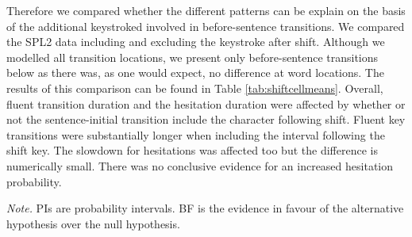 \begin{appendix}
Therefore we compared whether the different patterns can be explain on
the basis of the additional keystroked involved in before-sentence
transitions. We compared the SPL2 data including and excluding the
keystroke after shift. Although we modelled all transition locations, we
present only before-sentence transitions below as there was, as one
would expect, no difference at word locations. The results of this
comparison can be found in Table \ref{tab:shiftcellmeans}. Overall,
fluent transition duration and the hesitation duration were affected by
whether or not the sentence-initial transition include the character
following shift. Fluent key transitions were substantially longer when
including the interval following the shift key. The slowdown for
hesitations was affected too but the difference is numerically small.
There was no conclusive evidence for an increased hesitation
probability.

\begin{center}
\begin{ThreePartTable}

\begin{TableNotes}[para]
\normalsize{\textit{Note.} PIs are probability intervals. BF is the evidence in favour of the alternative hypothesis over the null hypothesis.}
\end{TableNotes}

\footnotesize{

}
\end{ThreePartTable}
\end{center}
\end{appendix}
